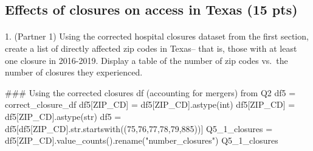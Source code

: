 \documentclass[
  letterpaper,
  DIV=11,
  numbers=noendperiod]{scrartcl}
\makeatletter
\let\oldparagraph\paragraph
\renewcommand{\paragraph}{
    \@ifstar
      \xxxParagraphStar
      \xxxParagraphNoStar
  }
\newcommand{\xxxParagraphStar}[1]{\oldparagraph*{#1}\mbox{}}
\newcommand{\xxxParagraphNoStar}[1]{\oldparagraph{#1}\mbox{}}
\newenvironment{Shaded}{\begin{snugshade}}{\end{snugshade}}
\newcommand{\BuiltInTok}[1]{\textcolor[rgb]{0.00,0.23,0.31}{#1}}
\newcommand{\CommentTok}[1]{\textcolor[rgb]{0.37,0.37,0.37}{#1}}
\newcommand{\NormalTok}[1]{\textcolor[rgb]{0.00,0.23,0.31}{#1}}
\newcommand{\OperatorTok}[1]{\textcolor[rgb]{0.37,0.37,0.37}{#1}}
\newcommand{\StringTok}[1]{\textcolor[rgb]{0.13,0.47,0.30}{#1}}
\makeatother
\begin{document}
\subsection{Effects of closures on access in Texas (15
pts)}\label{effects-of-closures-on-access-in-texas-15-pts}

\paragraph{1. (Partner 1) Using the corrected hospital closures dataset
from the first section, create a list of directly affected zip codes in
Texas-- that is, those with at least one closure in 2016-2019. Display a
table of the number of zip codes vs.~the number of closures they
experienced.}\label{partner-1-using-the-corrected-hospital-closures-dataset-from-the-first-section-create-a-list-of-directly-affected-zip-codes-in-texas-that-is-those-with-at-least-one-closure-in-2016-2019.-display-a-table-of-the-number-of-zip-codes-vs.-the-number-of-closures-they-experienced.}

\begin{Shaded}
\begin{Highlighting}[]
\CommentTok{\#\#\# Using the corrected closures df (accounting for mergers) from Q2}
\NormalTok{df5 }\OperatorTok{=}\NormalTok{ correct\_closure\_df}
\NormalTok{df5[}\StringTok{\textquotesingle{}ZIP\_CD\textquotesingle{}}\NormalTok{] }\OperatorTok{=}\NormalTok{ df5[}\StringTok{\textquotesingle{}ZIP\_CD\textquotesingle{}}\NormalTok{].astype(}\BuiltInTok{int}\NormalTok{)}
\NormalTok{df5[}\StringTok{\textquotesingle{}ZIP\_CD\textquotesingle{}}\NormalTok{] }\OperatorTok{=}\NormalTok{ df5[}\StringTok{\textquotesingle{}ZIP\_CD\textquotesingle{}}\NormalTok{].astype(}\BuiltInTok{str}\NormalTok{)}
\NormalTok{df5 }\OperatorTok{=}\NormalTok{ df5[df5[}\StringTok{\textquotesingle{}ZIP\_CD\textquotesingle{}}\NormalTok{].}\BuiltInTok{str}\NormalTok{.startswith((}\StringTok{\textquotesingle{}75\textquotesingle{}}\NormalTok{,}\StringTok{\textquotesingle{}76\textquotesingle{}}\NormalTok{,}\StringTok{\textquotesingle{}77\textquotesingle{}}\NormalTok{,}\StringTok{\textquotesingle{}78\textquotesingle{}}\NormalTok{,}\StringTok{\textquotesingle{}79\textquotesingle{}}\NormalTok{,}\StringTok{\textquotesingle{}885\textquotesingle{}}\NormalTok{))]}
\NormalTok{Q5\_1\_closures }\OperatorTok{=}\NormalTok{ df5[}\StringTok{\textquotesingle{}ZIP\_CD\textquotesingle{}}\NormalTok{].value\_counts().rename(}\StringTok{"number\_closures"}\NormalTok{)}
\NormalTok{Q5\_1\_closures}
\end{Highlighting}
\end{Shaded}
\end{document}
